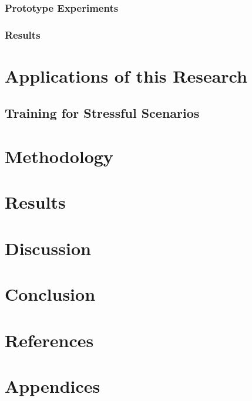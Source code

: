 \documentclass[12pt]{article}
\begin{document}
\subsubsection{Prototype Experiments}

\subsubsection{Results}

\section{Applications of this Research}



\subsection{Training for Stressful Scenarios}

\section{Methodology}

\section{Results}

\section{Discussion}

\section{Conclusion}

\section{References}




\section{Appendices}
\end{document}
